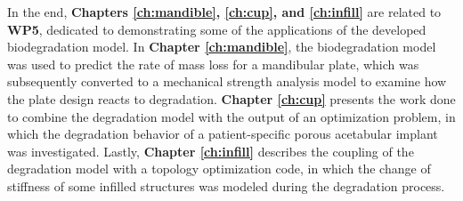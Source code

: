 In the end, \textbf{Chapters \ref{ch:mandible}, \ref{ch:cup}, and \ref{ch:infill}} are related to \textbf{WP5}, dedicated to demonstrating some of the applications of the developed biodegradation model. In \textbf{Chapter \ref{ch:mandible}}, the biodegradation model was used to predict the rate of mass loss for a mandibular plate, which was subsequently converted to a mechanical strength analysis model to examine how the plate design reacts to degradation. \textbf{Chapter \ref{ch:cup}} presents the work done to combine the degradation model with the output of an optimization problem, in which the degradation behavior of a patient-specific porous acetabular implant was investigated. Lastly, \textbf{Chapter \ref{ch:infill}} describes the coupling of the degradation model with a topology optimization code, in which the change of stiffness of some infilled structures was modeled during the degradation process.

\cleardoublepage
